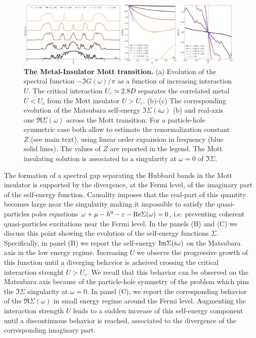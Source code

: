 \begin{figure}[t!]
  \includegraphics[width=\linewidth]{figures/figBethe.pdf}
    \caption{\label{figEx1}%
      \textbf{The Metal-Insulator Mott transition.}
      (a) Evolution of the spectral function $-\Im{G}(\omega)/\pi$ as
      a function of increasing interaction $U$. The critical
      interaction $U_c\simeq 2.8D$ separates the correlated metal $U<U_c$ from
      the Mott insulator $U>U_c$.
      (b)-(c) The corresponding evolution of the Matsubara self-energy
      $\Im\Sigma(i\omega)$ (b) and
      real-axis one $\Re\Sigma(\omega)$ across the Mott
      transition. For a particle-hole symmetric case both allow to
      estimate the renormalization constant $Z$ (see main text), using
      linear order expansion in frequency (blue solid lines). The
      values of $Z$ are reported in the legend.
      The Mott insulating solution is associated to a singularity at
      $\omega=0$ of $\Im\Sigma$. 
        }
\end{figure}

The formation of a spectral gap separating the Hubbard bands in the
Mott insulator is supported by the divergence, at the Fermi level, of the imaginary part of
the self-energy function. Causality imposes that the real-part of
this quantity becomes large near the singularity making it impossible
to satisfy the quasi-particles poles equations
$\omega+\mu-h^0-\varepsilon-{\rm Re}{\Sigma}(\omega)=0$, i.e. preventing coherent
quasi-particles excitations near the Fermi level. 
In the panels (B) and (C) we discuss this point  showing the evolution
of the self-energy functions $\Sigma$.
Specifically, in panel (B) we report the self-energy ${\rm Im}\Sigma(i\omega)$
on the Matsubara axis in the low energy regime. Increasing $U$
we observe the progressive growth of this function until a
diverging behavior is acheived crossing the critical interaction
strenght $U>U_c$.
We recall that this behavior can be observed on the Matsubara axis
because of the particle-hole symmetry of the problem which pins the
$\Im{\Sigma}$ singularity at $\omega=0$.
In panel (C), we report the corresponding behavior of the
$\Re{\Sigma}(\omega)$ in small energy regime around the Fermi
level. Augmenting the interaction strength $U$ leads to a sudden
increase of this self-energy component until a discontinuous behavior
is reached, associated to the divergence of the corresponding
imaginary part.   

